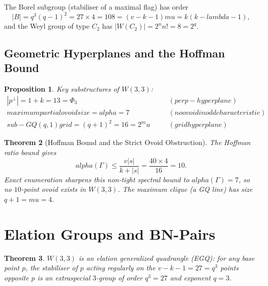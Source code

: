 \documentclass[12pt,a4paper]{article}
\def\mathrm#1{#1}%
\def\textbf#1{#1}%
\def\text#1{#1}%
\def\alpha{alpha}%
\def\lambda{lambda}%
\def\mu{mu}%
\def\Phi#1{Phi#1}%
\def\cdot{ }%
\newtheorem{theorem}{Theorem}[section]
\newtheorem{proposition}[theorem]{Proposition}
\theoremstyle{definition}
\newcommand{\GQ}{\mathrm{GQ}}
\newcommand{\Phithree}{\Phi_3}
\begin{document}
The \textbf{Borel subgroup} (stabiliser of a maximal flag) has order
\begin{equation}
|B| = q^3(q-1)^2 = 27\times 4 = 108 = (v-k-1)\cdot\mu = k(k-\lambda-1),
\end{equation}
and the \textbf{Weyl group} of type $C_2$ has
$|W(C_2)| = 2^n\cdot n! = 8 = 2^q$.


\subsection{Geometric Hyperplanes and the Hoffman Bound}

\begin{proposition}
Key substructures of $W(3,3)$:
\begin{equation}
\renewcommand{\arraystretch}{1.3}
\begin{array}{lcl}
|p^\perp| = 1+k = 13 = \Phithree
&\quad&\text{(perp-hyperplane)}\\[3pt]
\text{maximum partial ovoid size} = \alpha = 7
&\quad&\text{(no ovoid in odd characteristic)}\\[3pt]
\text{sub-}\GQ(q,1)\text{ grid} = (q+1)^2 = 16 = 2^\mu
&\quad&\text{(grid hyperplane)}
\end{array}
\end{equation}
\end{proposition}

\begin{theorem}[Hoffman Bound and the Strict Ovoid Obstruction]
The Hoffman ratio bound gives
\begin{equation}
\alpha(\Gamma)\le \frac{v|s|}{k+|s|}
= \frac{40\times 4}{16}=10.
\end{equation}
Exact enumeration sharpens this non-tight spectral bound to
$\alpha(\Gamma)=7$, so no $10$-point ovoid exists in $W(3,3)$.
The maximum clique (a GQ line) has size $q+1=\mu=4$.
\end{theorem}


\section{Elation Groups and BN-Pairs}
\label{sec:elation}

\begin{theorem}
$W(3,3)$ is an \textbf{elation generalized quadrangle} (EGQ):
for any base point $p$, the stabiliser of $p$ acting
regularly on the $v-k-1=27=q^3$ points opposite $p$ is an
\textbf{extraspecial $3$-group} of order $q^3=27$ and exponent $q=3$.
\end{theorem}
\end{document}

